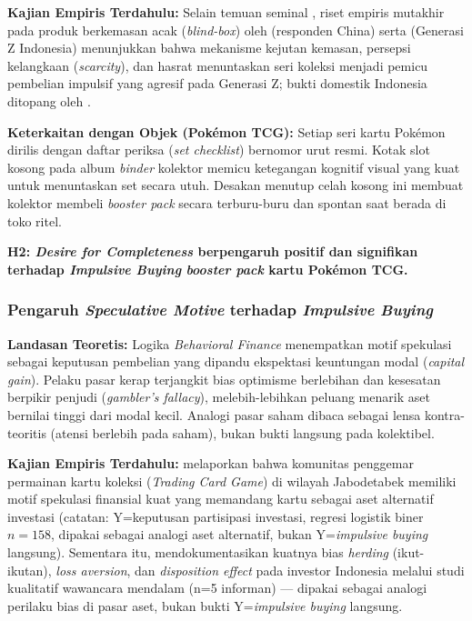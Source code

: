 \documentclass[12pt,a4paper]{article}
\numberwithin{equation}{section}
\numberwithin{table}{section}
\numberwithin{figure}{section}
\begin{document}
\noindent\textbf{Kajian Empiris Terdahulu:} Selain temuan seminal \citet{gao2014completing}, riset empiris mutakhir pada produk berkemasan acak (\emph{blind-box}) oleh \citet{gong2024unveiling} (responden China) serta \citet{dewi2026understanding} (Generasi Z Indonesia) menunjukkan bahwa mekanisme kejutan kemasan, persepsi kelangkaan (\emph{scarcity}), dan hasrat menuntaskan seri koleksi menjadi pemicu pembelian impulsif yang agresif pada Generasi Z; bukti domestik Indonesia ditopang oleh \citet{dewi2026understanding}.

\noindent\textbf{Keterkaitan dengan Objek (Pok\'emon TCG):} Setiap seri kartu Pok\'emon dirilis dengan daftar periksa (\emph{set checklist}) bernomor urut resmi. Kotak slot kosong pada album \emph{binder} kolektor memicu ketegangan kognitif visual yang kuat untuk menuntaskan set secara utuh. Desakan menutup celah kosong ini membuat kolektor membeli \emph{booster pack} secara terburu-buru dan spontan saat berada di toko ritel.

\vspace{0.2cm}
\textbf{H2: \emph{Desire for Completeness} berpengaruh positif dan signifikan terhadap \emph{Impulsive Buying} \emph{booster pack} kartu Pok\'emon TCG.}

\subsubsection{Pengaruh \emph{Speculative Motive} terhadap \emph{Impulsive Buying}}

\noindent\textbf{Landasan Teoretis:} Logika \emph{Behavioral Finance} \citep{kahneman1979prospect, shiller2000irrational} menempatkan motif spekulasi sebagai keputusan pembelian yang dipandu ekspektasi keuntungan modal (\emph{capital gain}). Pelaku pasar kerap terjangkit bias optimisme berlebihan dan kesesatan berpikir penjudi (\emph{gambler's fallacy}), melebih-lebihkan peluang menarik aset bernilai tinggi dari modal kecil. Analogi pasar saham \citep{barber2008all} dibaca sebagai lensa kontra-teoritis (atensi berlebih pada saham), bukan bukti langsung pada kolektibel.

\noindent\textbf{Kajian Empiris Terdahulu:} \citet{aryadi2024personal} melaporkan bahwa komunitas penggemar permainan kartu koleksi (\emph{Trading Card Game}) di wilayah Jabodetabek memiliki motif spekulasi finansial kuat yang memandang kartu sebagai aset alternatif investasi (catatan: Y=keputusan partisipasi investasi, regresi logistik biner $n=158$, dipakai sebagai analogi aset alternatif, bukan Y=\emph{impulsive buying} langsung). Sementara itu, \citet{colline2024biases} mendokumentasikan kuatnya bias \emph{herding} (ikut-ikutan), \emph{loss aversion}, dan \emph{disposition effect} pada investor Indonesia melalui studi kualitatif wawancara mendalam (n=5 informan) — dipakai sebagai analogi perilaku bias di pasar aset, bukan bukti Y=\emph{impulsive buying} langsung.
\end{document}
